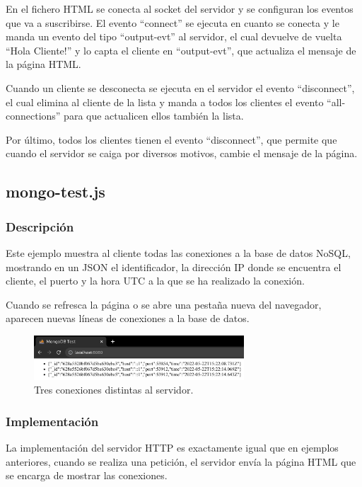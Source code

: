 \documentclass{article}
\begin{document}
En el fichero HTML se conecta al socket del servidor y se configuran los eventos que va a suscribirse. El evento ``connect'' se ejecuta en cuanto se conecta y le manda un evento del tipo ``output-evt'' al servidor, el cual devuelve de vuelta ``Hola Cliente!'' y lo capta el cliente en ``output-evt'', que actualiza el mensaje de la página HTML.

Cuando un cliente se desconecta se ejecuta en el servidor el evento ``disconnect'', el cual elimina al cliente de la lista y manda a todos los clientes el evento ``all-connections'' para que actualicen ellos también la lista.

Por último, todos los clientes tienen el evento ``disconnect'', que permite que cuando el servidor se caiga por diversos motivos, cambie el mensaje de la página.



\subsection{mongo-test.js}
\subsubsection{Descripción}
Este ejemplo muestra al cliente todas las conexiones a la base de datos NoSQL, mostrando en un JSON el identificador, la dirección IP donde se encuentra el cliente, el puerto y la hora UTC a la que se ha realizado la conexión.

Cuando se refresca la página o se abre una pestaña nueva del navegador, aparecen nuevas líneas de conexiones a la base de datos.

\begin{figure}[H]
    \centering
    \includegraphics[width=0.7\textwidth]{images/mongo3.png}
    \caption{Tres conexiones distintas al servidor.}
\end{figure}

\subsubsection{Implementación}
La implementación del servidor HTTP es exactamente igual que en ejemplos anteriores, cuando se realiza una petición, el servidor envía la página HTML que se encarga de mostrar las conexiones.
\end{document}
